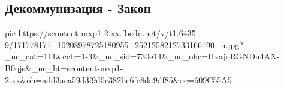  
 
 
 
 

\subsection{Декоммунизация - Закон}

\ifcmt
  pic https://scontent-mxp1-2.xx.fbcdn.net/v/t1.6435-9/171778171_10208978725180955_2521258212733166190_n.jpg?_nc_cat=111&ccb=1-3&_nc_sid=730e14&_nc_ohc=HxajoRGNDu4AX-B0qjs&_nc_ht=scontent-mxp1-2.xx&oh=add3aca59d3f9d5e382be6fe8da9df85&oe=609C55A5
\fi

